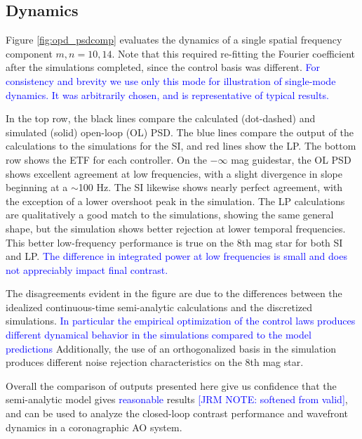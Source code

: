\documentclass[10pt,preprint]{aastex631}
\newcommand{\jrmadd}[1]{\textcolor{blue}{#1}}
\begin{document}
\subsection{Dynamics}
Figure \ref{fig:opd_psdcomp} evaluates the dynamics of a single spatial frequency component  $m,n = 10,14$.  Note that this required re-fitting the Fourier coefficient after the simulations completed, since the control basis was different.  \jrmadd{For consistency and brevity we use only this mode for illustration of single-mode dynamics.  It was arbitrarily chosen, and is representative of typical results.}

In the top row, the black lines compare the calculated (dot-dashed) and simulated (solid) open-loop (OL) PSD.  The blue lines compare the output of the calculations to the simulations for the SI, and red lines show the LP.  The bottom row shows the ETF for each controller.  On the $-\infty$ mag guidestar, the OL PSD shows excellent agreement at low frequencies, with a slight divergence in slope beginning at a $\sim$100 Hz. The SI likewise shows nearly perfect agreement, with the exception of a lower overshoot peak in the simulation.  The LP calculations are qualitatively a good match to the simulations, showing the same general shape, but the simulation shows better rejection at lower temporal frequencies.  This better low-frequency performance is true on the 8th mag star for both SI and LP.  \jrmadd{The difference in integrated power at low frequencies is small and does not appreciably impact final contrast.}  

The disagreements evident in the figure are due to the differences between the idealized continuous-time semi-analytic calculations and the discretized simulations. \jrmadd{In particular the empirical optimization of the control laws produces different dynamical behavior in the simulations compared to the model predictions} Additionally, the use of an orthogonalized basis in the simulation produces different noise rejection characteristics on the 8th mag star.  

Overall the comparison of outputs presented here give us confidence that the semi-analytic model gives \jrmadd{reasonable} results \jrmadd{[JRM NOTE: softened from valid]}, and can be used to analyze the closed-loop contrast performance and wavefront dynamics in a coronagraphic AO system.
\end{document}
